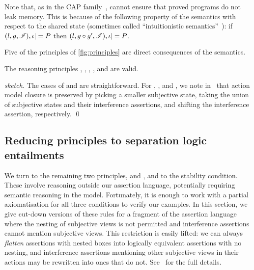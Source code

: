 Note that, as in the CAP family~\cite{cap-ecoop10,icap,tada}, \colosl
cannot ensure that proved programs do not leak memory. This is because
of the following property of the semantics with respect to the shared
state (sometimes called ``intuitionistic semantics''~\cite{rey02}): if
$(l,g,\mathscr{I}), \iota |= P$ then $(l,g\circ g',\mathscr{I}), \iota |= P$.


Five of the principles of \fig\ref{fig:principles} are direct
consequences of the semantics.

\begin{lemma}
  \label{lem:assertion-facts}
  The \colosl reasoning principles 
  \forgetRule, \mergeRule, \shiftRule, \weakenRule, and \copyRule are valid.
\end{lemma}
\begin{proof}[sketch]
  The cases of \weakenRule and \copyRule are straightforward. For
  \forgetRule, \mergeRule, and \shiftRule, we note
  in~\cite{colosl-tr14} that action model closure is preserved by
  picking a smaller subjective state, taking the union of subjective
  states and their interference assertions, and shifting the
  interference assertion, respectively.
  \qed
\end{proof}


\subsection{Reducing \colosl principles to separation logic entailments}
\label{subsec:prules}

We turn to the remaining two principles, \extendRule and \shiftRule,
and to the stability condition. These involve reasoning outside our
assertion language, potentially requiring semantic reasoning 
in the model. Fortunately, it is enough to work
with a partial 
axiomatisation  for all three conditions to verify
our examples. In this section, we give cut-down versions of these
rules for a fragment of the \colosl assertion language where the 
nesting of subjective views is not permitted   and  interference
assertions cannot mention subjective views. This restriction is easily
lifted: we can always \emph{flatten}
assertions with nested boxes into logically equivalent assertions with
no nesting, and  interference assertions  mentioning  other
subjective views in their actions may be rewritten into ones
that do not.  See~\cite{colosl-tr14} for the full details.%

